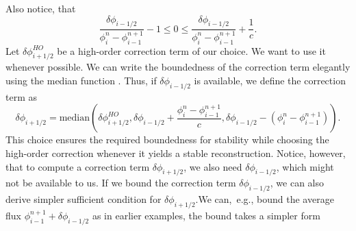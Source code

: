 \documentclass[../thesis.tex]{subfiles}
\begin{document}
Also notice, that
\begin{equation}
    \frac{\delta \phi_{i-1/2}}
    {\phi_{i}^{n} - \phi_{i-1}^{n+1}}
    -1
    \leq
    0
    \leq
    \frac{\delta \phi_{i-1/2}}
    {\phi_{i}^{n} - \phi_{i-1}^{n+1}}
    +\frac{1}{c}.
\end{equation}
Let \(\delta \phi_{i+1/2}^{HO}\) be a high-order correction term of our choice. We want to use it whenever possible.
We can write the boundedness of the correction term elegantly using the median function \cite{1989_Huynh_CONF}.
Thus, if \(\delta \phi_{i-1/2}\) is available, we define the correction term as
\begin{equation}
    \delta \phi_{i+1/2} = \mbox{median}\left(
        \delta \phi_{i+1/2}^{HO},
        \delta \phi_{i-1/2} + \frac{\phi_{i}^{n} - \phi_{i-1}^{n+1}}{c},
        \delta \phi_{i-1/2} - (\phi_{i}^{n} - \phi_{i-1}^{n+1})
    \right).
\end{equation}
This choice ensures the required boundedness for stability while choosing the high-order correction whenever it yields a stable reconstruction.
Notice, however, that to compute a correction term \(\delta \phi_{i+1/2}\), we also need \(\delta \phi_{i-1/2}\), which might not be available to us.
If we bound the correction term \(\delta \phi_{i-1/2}\), we can also derive simpler sufficient condition for \(\delta \phi_{i+1/2}\).We can,~e.g., bound the average flux \(\phi_{i-1}^{n+1} + \delta \phi_{i-1/2}\) as in earlier examples, the bound takes a simpler form
\end{document}
